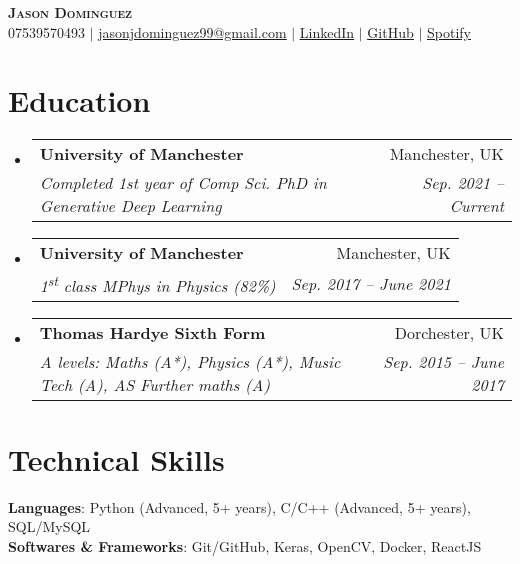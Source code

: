 \documentclass[letterpaper,11pt]{article}
\makeatletter
\newcommand{\resumeSubheading}[4]{
  \vspace{-2pt}\item
    \begin{tabular*}{0.97\textwidth}[t]{l@{\extracolsep{\fill}}r}
      \textbf{#1} & #2 \\
      \textit{\small#3} & \textit{\small #4} \\
    \end{tabular*}\vspace{-7pt}
}
\newcommand{\resumeSubHeadingListStart}{\begin{itemize}[leftmargin=0.15in, label={}]}
\newcommand{\resumeSubHeadingListEnd}{\end{itemize}}
\makeatother
\begin{document}

\begin{center}
    \textbf{\Huge \scshape Jason Dominguez} \\ \vspace{1pt}
    \small 07539570493 $|$ \href{mailto:jasonjdominguez99@gmail.com}{\underline{jasonjdominguez99@gmail.com}} $|$ 
    \href{https://www.linkedin.com/in/jasonjdominguez99/}{\underline{LinkedIn}} $|$
    \href{https://github.com/jasonjdominguez99}{\underline{GitHub}} $|$
    \href{https://open.spotify.com/artist/6vROqVU2bVHOp3V4q09ljN?si=fedCBXksTGm1AKXGwlDVHA}{\underline{Spotify}}
\end{center}


\section{Education}
  \resumeSubHeadingListStart
    \resumeSubheading
      {University of Manchester}{Manchester, UK}
      {Completed 1st year of Comp Sci. PhD in Generative Deep Learning}{Sep. 2021 -- Current}
    \resumeSubheading
      {University of Manchester}{Manchester, UK}
      {1\textsuperscript{st} class MPhys in Physics (82\%)}{Sep. 2017 -- June 2021}
    \resumeSubheading
      {Thomas Hardye Sixth Form}{Dorchester, UK}
      {A levels: Maths (A*), Physics (A*), Music Tech (A), AS Further maths (A)}{Sep. 2015 -- June 2017}
  \resumeSubHeadingListEnd

\section{Technical Skills}
 \begin{itemize}[leftmargin=0.15in, label={}]
    \small{\item{
     \textbf{Languages}{: Python (Advanced, 5+ years), C/C++ (Advanced, 5+ years), SQL/MySQL} \\
     \textbf{Softwares \& Frameworks}{: Git/GitHub, Keras, OpenCV, Docker, ReactJS} \\
     
    }}
 \end{itemize}
 
\end{document}
